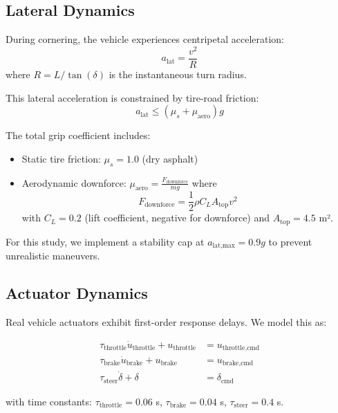 \documentclass[12pt]{article}
\begin{document}
\subsection{Lateral Dynamics}

During cornering, the vehicle experiences centripetal acceleration:
\begin{equation}
a_{\text{lat}} = \frac{v^2}{R}
\end{equation}
where $R = L / \tan(\delta)$ is the instantaneous turn radius.

This lateral acceleration is constrained by tire-road friction:
\begin{equation}
a_{\text{lat}} \leq (\mu_s + \mu_{\text{aero}}) g
\end{equation}

The total grip coefficient includes:
\begin{itemize}
    \item Static tire friction: $\mu_s = 1.0$ (dry asphalt)
    \item Aerodynamic downforce: $\mu_{\text{aero}} = \frac{F_{\text{downforce}}}{mg}$ where
    \begin{equation}
    F_{\text{downforce}} = \frac{1}{2} \rho C_L A_{\text{top}} v^2
    \end{equation}
    with $C_L = 0.2$ (lift coefficient, negative for downforce) and $A_{\text{top}} = 4.5$ m².
\end{itemize}

For this study, we implement a stability cap at $a_{\text{lat,max}} = 0.9g$ to prevent unrealistic maneuvers.

\subsection{Actuator Dynamics}

Real vehicle actuators exhibit first-order response delays. We model this as:

\begin{align}
\tau_{\text{throttle}} \dot{u}_{\text{throttle}} + u_{\text{throttle}} &= u_{\text{throttle,cmd}} \\
\tau_{\text{brake}} \dot{u}_{\text{brake}} + u_{\text{brake}} &= u_{\text{brake,cmd}} \\
\tau_{\text{steer}} \dot{\delta} + \delta &= \delta_{\text{cmd}}
\end{align}

with time constants: $\tau_{\text{throttle}} = 0.06$ s, $\tau_{\text{brake}} = 0.04$ s, $\tau_{\text{steer}} = 0.4$ s.
\end{document}
